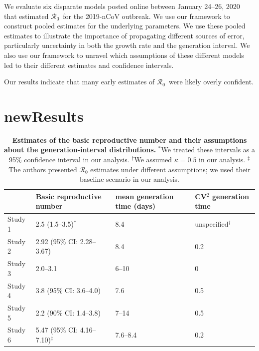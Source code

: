 \documentclass[12pt]{article}
\newcommand{\Rx}[1]{\ensuremath{{\mathcal R}_{#1}}}
\newcommand{\Ro}{\Rx{0}}
\begin{document}
We evaluate six disparate models posted online between January 24--26, 2020 that estimated \Ro\ for the 2019-nCoV outbreak. We use our framework to construct pooled estimates for the underlying parameters. We use these pooled estimates to illustrate the importance of propagating different sources of error, particularly uncertainty in both the growth rate and the generation interval. We also use our framework to unravel which assumptions of these different models led to their different estimates and confidence intervals.

Our results indicate that many early estimates of \Ro\ were likely overly confident.

\section{newResults}

\begin{table}[t]
\begin{center}
\footnotesize
\begin{tabular}{l|l|l|l}
 & Basic reproductive number & mean generation time (days) & CV$^2$ generation time \\
\hline
Study 1 & 2.5 (1.5--3.5)$^\ast$ & 8.4 & unspecified$^\dagger$ \\
\hline
Study 2 & 2.92 (95\% CI: 2.28--3.67) & 8.4 & 0.2 \\
\hline
Study 3 & 2.0--3.1 & 6--10 & 0 \\
\hline
Study 4 & 3.8 (95\% CI: 3.6--4.0) & 7.6 & 0.5 \\
\hline
Study 5 & 2.2 (90\% CI: 1.4--3.8) & 7--14 & 0.5\\
\hline
Study 6 & 5.47 (95\% CI: 4.16--7.10)$^\ddagger$ & 7.6--8.4 & 0.2
\end{tabular}
\end{center}
\caption{
\textbf{Estimates of the basic reproductive number and their assumptions about the generation-interval distributions.}
$^\ast$We treated these intervals as a 95\% confidence interval in our analysis.
$^\dagger$We assumed $\kappa = 0.5$ in our analysis.
$^\ddagger$The authors presented $\mathcal R_0$ estimates under different assumptions; we used their baseline scenario in our analysis.
}
\end{table}
\end{document}
